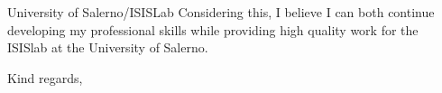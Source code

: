 \documentclass[11pt]{letter}
\begin{document}
\begin{letter}{University of Salerno/ISISLab}
  Considering this, I believe I can both continue developing my professional skills while providing high quality work
  for the ISISlab at the University of Salerno.
  
  \closing{Kind regards,}

  
\end{letter}
\end{document}
